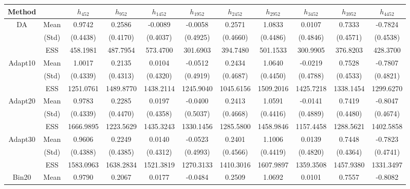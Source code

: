 { \renewcommand{\arraystretch}{1.2} 
\begin{table} 
\center 
\begin{tabular}{cc ccccccccc} 
 Method &  & $h_{452}$ & $h_{952}$ & $h_{1452}$ & $h_{1952}$ & $h_{2452}$ & $h_{2952}$ & $h_{3452}$ & $h_{3952}$ & $h_{4452}$ \\ \hline  \hline
\rowcolor{LightCyan} 
DA & Mean 
 & 0.9742  & 0.2586  & -0.0089  & -0.0058  & 0.2571  & 1.0833  & 0.0107  & 0.7333  & -0.7824  \\  [0.75ex] 
 & (Std) 
 & (0.4438)  & (0.4170)  & (0.4037)  & (0.4925)  & (0.4660)  & (0.4486)  & (0.4846)  & (0.4571)  & (0.4538)  \\  [0.75ex] 
 [111.83 s] & ESS 
 & 458.1981  & 487.7954  & 573.4700  & 301.6903  & 394.7480  & 501.1533  & 300.9905  & 376.8203  & 428.3700  \\  [0.75ex] 
\rowcolor{LightCyan} 
Adapt10 & Mean 
 & 1.0017  & 0.2135  & 0.0104  & -0.0512  & 0.2434  & 1.0640  & -0.0219  & 0.7528  & -0.7807  \\  [0.75ex] 
 & (Std) 
 & (0.4339)  & (0.4313)  & (0.4320)  & (0.4919)  & (0.4687)  & (0.4450)  & (0.4788)  & (0.4533)  & (0.4821)  \\  [0.75ex] 
 [1980.48 s] & ESS 
 & 1251.0761  & 1489.8770  & 1438.2114  & 1245.9040  & 1045.6156  & 1509.2016  & 1425.7218  & 1338.1454  & 1299.6270  \\  [0.75ex] 
\rowcolor{LightCyan} 
Adapt20 & Mean 
 & 0.9783  & 0.2285  & 0.0197  & -0.0400  & 0.2413  & 1.0591  & -0.0141  & 0.7419  & -0.8047  \\  [0.75ex] 
 & (Std) 
 & (0.4339)  & (0.4470)  & (0.4358)  & (0.5037)  & (0.4668)  & (0.4416)  & (0.4889)  & (0.4480)  & (0.4674)  \\  [0.75ex] 
 [2290.29 s] & ESS 
 & 1666.9895  & 1223.5629  & 1435.3243  & 1330.1456  & 1285.5800  & 1458.9846  & 1157.4458  & 1288.5621  & 1402.5858  \\  [0.75ex] 
\rowcolor{LightCyan} 
Adapt30 & Mean 
 & 0.9606  & 0.2249  & 0.0140  & -0.0523  & 0.2401  & 1.1006  & 0.0139  & 0.7448  & -0.7823  \\  [0.75ex] 
 & (Std) 
 & (0.4388)  & (0.4385)  & (0.4312)  & (0.4993)  & (0.4566)  & (0.4419)  & (0.4820)  & (0.4364)  & (0.4741)  \\  [0.75ex] 
 [2566.66 s] & ESS 
 & 1583.0963  & 1638.2834  & 1521.3819  & 1270.3133  & 1410.3016  & 1607.9897  & 1359.3508  & 1457.9380  & 1331.3497  \\  [0.75ex] 
\rowcolor{LightCyan} 
Bin20 & Mean 
 & 0.9790  & 0.2067  & 0.0177  & -0.0484  & 0.2509  & 1.0692  & 0.0101  & 0.7557  & -0.8082  \\  [0.75ex] 

\end{tabular}
\end{table}}

